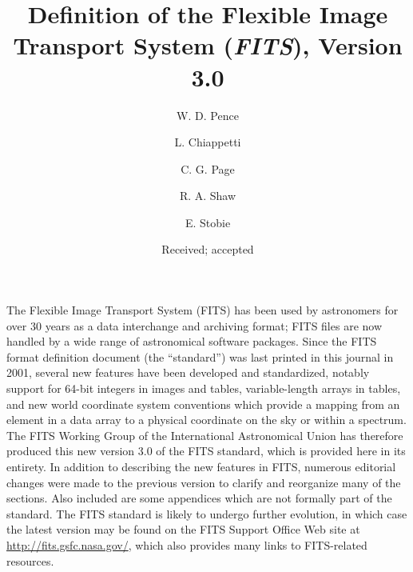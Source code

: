 \documentclass[onecolumn]{aa}
\begin{document}
\onecolumn
\cleardoublepage
		  
\setcounter{page}{1}
\pagestyle{headings}

\tableofcontents
\listoftables

\cleardoublepage

\ifonecol
\else
\twocolumn
\fi

\setcounter{page}{1}

\fi



\ifaastyle


\title{Definition of the Flexible Image Transport System ({\em FITS\/}), Version 3.0}

\author{W. D. Pence 
\and
        L. Chiappetti 
	\and
        C. G. Page 
	\and
	R. A. Shaw 
	\and
	E. Stobie 
	}


\date{Received; accepted}

\abstract
{
The Flexible Image Transport System (FITS) has been used by astronomers 
for over 30 years as a data interchange and archiving format; FITS  files
are now handled by a wide range of astronomical software packages.  Since
the FITS format definition document (the ``standard'') was last printed
in this journal in 2001,  several new features have been developed and
standardized, notably  support for 64-bit integers in images and tables,
variable-length arrays in tables,  and new world coordinate system
conventions  which provide a mapping from an element in  a data array to
a physical coordinate on the sky or within a spectrum.  The FITS Working
Group of the International Astronomical Union has  therefore produced
this new version 3.0 of the FITS standard, which is provided  here in its
entirety.  In addition to describing the new features in FITS, numerous
editorial changes were made to the previous version to clarify and
reorganize many of the sections. Also included are some appendices which
are not formally part of the standard.  The FITS standard is likely to
undergo further evolution, in which case the latest version  may be found
on the FITS Support Office Web site at \url{http://fits.gsfc.nasa.gov/}, which
also provides many links to  FITS-related resources.  
}
\end{document}
